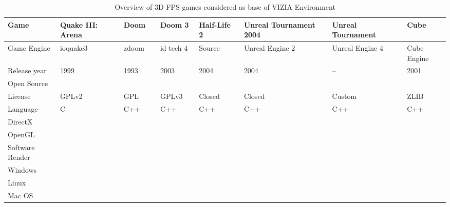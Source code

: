 \documentclass[english,bachelor,a4paper,twoside]{ppfcmthesis}
\newcommand*\OK{\ding{51}}
\begin{document}
\begin{table}[]
\centering
\caption{Overview of 3D FPS games considered as base of VIZIA Environment}
\label{tab:engines}
\begin{tabular}{|p{2cm}||p{1.3cm}|p{1.3cm}|p{1.3cm}|p{1.3cm}|p{1.3cm}|p{1.3cm}|p{1.3cm}|}
\hline
Game                      & Quake III: Arena \cite{quake1}~\cite{quake2} & Doom \cite{doomreq}~\cite{zdoom}~\cite{zdoom-wiki}  & Doom 3 \cite{d3req}~\cite{idtech4}    & Half-Life 2 \cite{half2}~\cite{source} & Unreal Tournament 2004 \cite{ut04rqe}~\cite{ue2} & Unreal Tournament \cite{ue4req}~\cite{ue4faq} & Cube~\cite{cube}        \\ \hline
Game Engine               & ioquake3         & zdoom & id tech 4 & Source      & Unreal Engine 2        & Unreal Engine 4   & Cube Engine \\ \hline
Release year               & 1999             & 1993  & 2003      & 2004        & 2004                   & --\footnotemark              & 2001        \\ \hline
Open Source               & \OK              & \OK   & \OK       &             &                        & \OK               & \OK         \\ \hline
License                   & GPLv2            & GPL   & GPLv3     & Closed      & Closed                 & Custom            & ZLIB        \\ \hline
Language                  & C                & C++   & C++       & C++         & C++                    & C++               & C++         \\ \hline
DirectX                   &                  &       & \OK       & \OK         &                        & \OK               &             \\ \hline
OpenGL                    & \OK              & \OK\footnotemark   & \OK       & \OK         & \OK                    & \OK               & \OK         \\ \hline
Software Render           &                  & \OK   &           &             &                        &                   &             \\ \hline
Windows                   & \OK              & \OK   & \OK       & \OK         & \OK                    & \OK               & \OK         \\ \hline
Linux                     & \OK              & \OK   & \OK       & \OK         & \OK                    & \OK               & \OK         \\ \hline
Mac OS                    & \OK              & \OK   & \OK       & \OK         & \OK                    & \OK               &             \\ \hline

\end{tabular}
\end{table}
\end{document}
